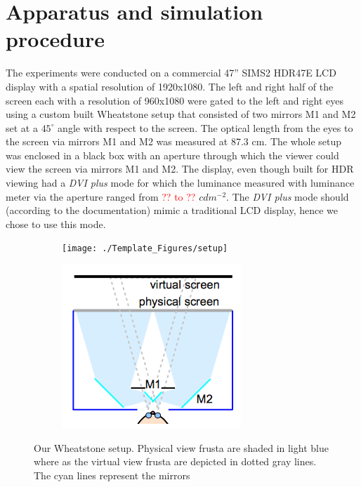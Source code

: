 \section{Apparatus and simulation procedure}
The experiments were conducted on a commercial 47'' SIMS2 HDR47E LCD display with a spatial resolution of 1920x1080. The left and right half of the screen each with a resolution of 960x1080 were gated to the left and right eyes using a custom built Wheatstone setup \cite{ wiki:wheatstone} that consisted of two mirrors M1 and M2 set at a $45^\circ$ angle with respect to the screen. The optical length from the eyes to the screen via mirrors M1 and M2 was measured at 87.3 cm. The whole setup was enclosed in a black box with an aperture through which the viewer could view the screen via mirrors M1 and M2. The display, even though built for HDR viewing had a \emph{DVI plus} mode for which the luminance measured with luminance meter via the aperture ranged from \textcolor{red}{?? to ??} $cdm^{-2}$. The \emph{DVI plus} mode should (according to the documentation) mimic a traditional LCD display, hence we chose to use this mode.
\begin{figure}[htbp]
    \begin{subfigure}[b]{0.5\textwidth}
        \texttt{[image: ./Template\_Figures/setup]}
        \caption{}\label{fig:setup}
    \end{subfigure}
    \begin{subfigure}[b]{0.4\textwidth}
        \includegraphics[width=\textwidth]{./Template_Figures/setup_sch}
        \caption{}\label{fig:setup_sch}
    \end{subfigure}
    \caption{Our Wheatstone setup. Physical view frusta are shaded in light blue where as the virtual view frusta are depicted in dotted gray lines. The cyan lines represent the mirrors \cite{vangorp2014depth}\label{fig:wheatstone_setup}}
\end{figure}

